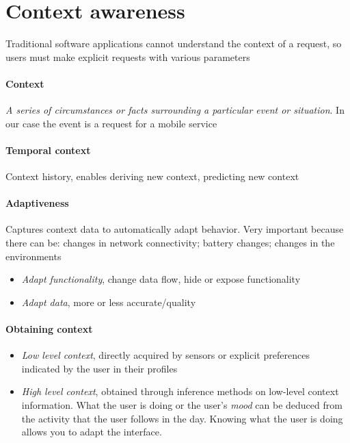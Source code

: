 \section{Context awareness}
Traditional software applications cannot understand the context of a request, so users must make explicit requests with various parameters

\paragraph{Context}
 \textit{A series of circumstances or facts surrounding a particular event or situation}. In our case the event is a request for a mobile service

 \paragraph{Temporal context}
 Context history, enables deriving new context, predicting new context

 \paragraph{Adaptiveness}
Captures context data to automatically adapt behavior. Very important because there can be: changes in network connectivity; battery changes; changes in the environments
\begin{itemize}
    \item \textit{Adapt functionality}, change data flow, hide or expose functionality
    \item \textit{Adapt data}, more or less accurate/quality
\end{itemize}

\paragraph{Obtaining context}
\begin{itemize}
    \item \textit{Low level context}, directly acquired by sensors or explicit preferences indicated by the user in their profiles
    \item \textit{High level context}, obtained through inference methods on low-level context information. What the user is doing or the user’s \textit{mood} can be deduced from the activity that the user follows in the day. Knowing what the user is doing allows you to adapt the interface.
\end{itemize}

